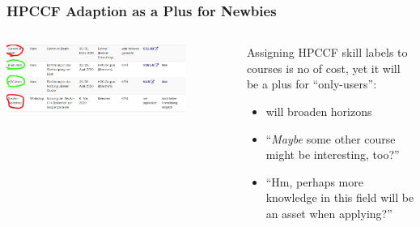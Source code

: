 \begin{frame}
  \frametitle{HPCCF Adaption as a Plus for Newbies}
  \begin{columns}
   \begin{column}{0.5\textwidth}
    \centering
    \includegraphics[width=0.8\textwidth]{images/linking_skills_users}\\
   \end{column}
   \begin{column}{0.5\textwidth}
     Assigning HPCCF skill labels to courses is no of cost, yet it will be a plus for ``only-users'':
     \begin{itemize}
      \item will broaden horizons
      \item ``\emph{Maybe} some other course might be interesting, too?''
      \item ``Hm, perhaps more knowledge in this field will be an asset when applying?''
     \end{itemize}
   \end{column}
  \end{columns}
\end{frame}


